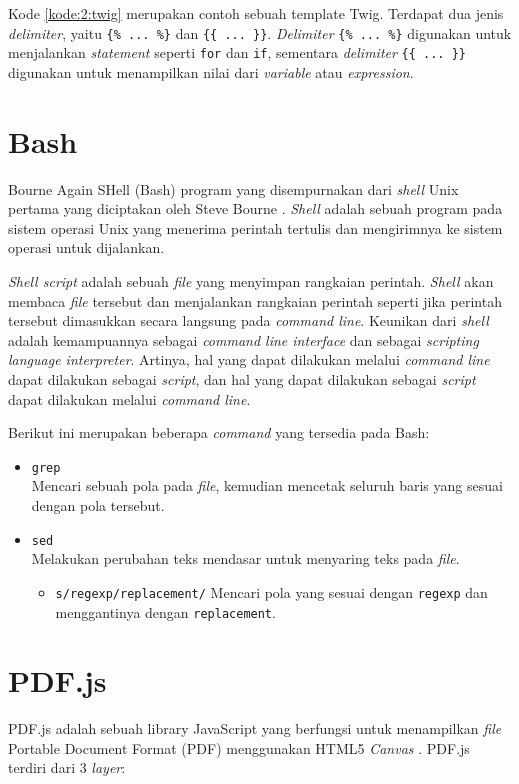 Kode \ref{kode:2:twig} merupakan contoh sebuah template Twig. Terdapat dua jenis \textit{delimiter}, yaitu \verb|{% ... %}| dan \verb|{{ ... }}|. \textit{Delimiter} \verb|{% ... %}| digunakan untuk menjalankan \textit{statement} seperti \verb|for| dan \verb|if|, sementara \textit{delimiter} \verb|{{ ... }}| digunakan untuk menampilkan nilai dari \textit{variable} atau \textit{expression}.

\section{Bash}
\label{sec:2:shell}
Bourne Again SHell (Bash) program yang disempurnakan dari \textit{shell} Unix pertama yang diciptakan oleh Steve Bourne \cite{linux}. \textit{Shell} adalah sebuah program pada sistem operasi Unix yang menerima perintah tertulis dan mengirimnya ke sistem operasi untuk dijalankan. 

\textit{Shell script} adalah sebuah \textit{file} yang menyimpan rangkaian perintah. \textit{Shell} akan membaca \textit{file} tersebut dan menjalankan rangkaian perintah seperti jika perintah tersebut dimasukkan secara langsung pada \textit{command line}. Keunikan dari \textit{shell} adalah kemampuannya sebagai \textit{command line interface} dan sebagai  \textit{scripting language interpreter}. Artinya, hal yang dapat dilakukan melalui \textit{command line} dapat dilakukan sebagai \textit{script}, dan hal yang dapat dilakukan sebagai \textit{script} dapat dilakukan melalui \textit{command line}.

Berikut ini merupakan beberapa \textit{command} yang tersedia pada Bash:

\begin{itemize}
    \item \verb|grep| \\ Mencari sebuah pola pada \textit{file}, kemudian mencetak seluruh baris yang sesuai dengan pola tersebut.
    \item \verb|sed| \\ Melakukan perubahan teks mendasar untuk menyaring teks pada \textit{file}.
    \begin{itemize}
        \item \verb|s/regexp/replacement/| Mencari pola yang sesuai dengan \verb|regexp| dan menggantinya dengan \verb|replacement|.
    \end{itemize}
\end{itemize}

\section{PDF.js}
\label{sec:2:pdfjs} 
PDF.js adalah sebuah library JavaScript yang berfungsi untuk menampilkan \textit{file} Portable Document Format (PDF) menggunakan HTML5 \textit{Canvas} \cite{pdfjs}. PDF.js terdiri dari 3 \textit{layer}:

